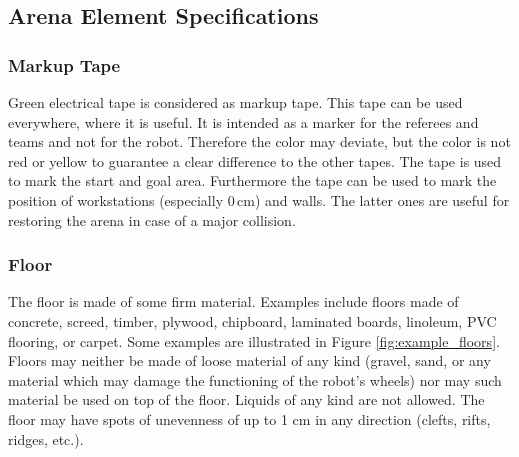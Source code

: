 \subsection{Arena Element Specifications}
\label{subsec: Arena Element Specifications}

\subsubsection{Markup Tape}
\label{subsubsec: Markup Tape}

Green electrical tape is considered as markup tape. This tape can be used everywhere, where it is useful. It is intended as a marker for the referees and teams and not for the robot. Therefore the color may deviate, but the color is not red or yellow to guarantee a clear difference to the other tapes. The tape is used to mark the start and goal area. Furthermore the tape can be used to mark the position of workstations (especially $0\,\text{cm}$) and walls. The latter ones are useful for restoring the arena in case of a major collision.

\subsubsection{Floor}
The floor is made of some firm material. Examples include floors made of concrete, screed, timber, plywood, chipboard, laminated boards, linoleum, PVC flooring, or carpet. Some examples are illustrated in Figure \ref{fig:example_floors}. Floors may neither be made of loose material of any kind (gravel, sand, or any material which may damage the functioning of the robot's wheels) nor may such material be used on top of the floor. Liquids of any kind are not allowed. The floor may have spots of unevenness of up to 1 cm in any direction (clefts, rifts, ridges, etc.).

